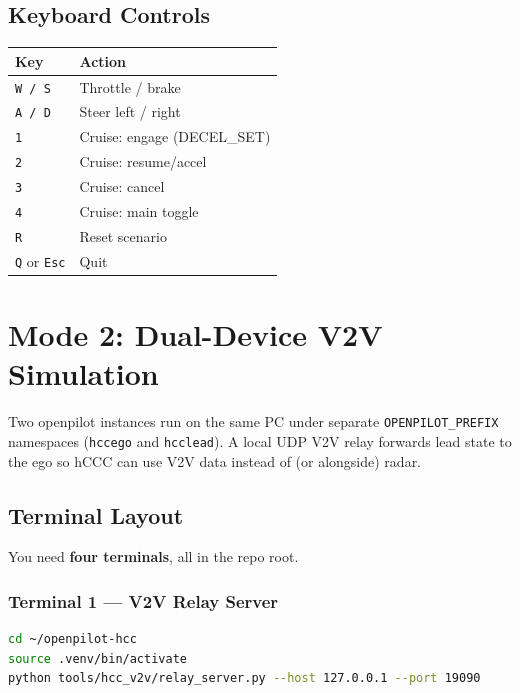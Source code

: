 \documentclass[11pt, letterpaper]{article}
\begin{document}
\subsection{Keyboard Controls}

\begin{center}
\begin{tabular}{@{}ll@{}}
\toprule
\textbf{Key} & \textbf{Action} \\
\midrule
\texttt{W / S}           & Throttle / brake \\
\texttt{A / D}           & Steer left / right \\
\texttt{1}               & Cruise: engage (DECEL\_SET) \\
\texttt{2}               & Cruise: resume/accel \\
\texttt{3}               & Cruise: cancel \\
\texttt{4}               & Cruise: main toggle \\
\texttt{R}               & Reset scenario \\
\texttt{Q} or \texttt{Esc} & Quit \\
\bottomrule
\end{tabular}
\end{center}


\section{Mode 2: Dual-Device V2V Simulation}
\label{sec:mode2}

Two openpilot instances run on the same PC under separate
\texttt{OPENPILOT\_PREFIX} namespaces (\texttt{hccego} and
\texttt{hcclead}).  A local UDP V2V relay forwards lead state to the ego
so hCCC can use V2V data instead of (or alongside) radar.

\subsection{Terminal Layout}

You need \textbf{four terminals}, all in the repo root.

\subsubsection{Terminal 1 --- V2V Relay Server}

\begin{lstlisting}[language=bash]
cd ~/openpilot-hcc
source .venv/bin/activate
python tools/hcc_v2v/relay_server.py --host 127.0.0.1 --port 19090
\end{lstlisting}
\end{document}
